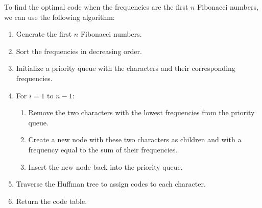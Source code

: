 \noindent To find the optimal code when the frequencies are the first $n$
Fibonacci numbers, we can use the following algorithm:
\begin{enumerate}
    \item Generate the first $n$ Fibonacci numbers.
    
    \item Sort the frequencies in decreasing order.
    
    \item Initialize a priority queue with the characters and their
    corresponding frequencies.
    
    \item For $i = 1$ to $n - 1$:
    \begin{enumerate}
        \item Remove the two characters with the lowest frequencies from the
        priority queue.
        
        \item Create a new node with these two characters as children and with a
        frequency equal to the sum of their frequencies.
        
        \item Insert the new node back into the priority queue.
    \end{enumerate}
    
    \item Traverse the Huffman tree to assign codes to each character.
    
    \item Return the code table.
\end{enumerate}
